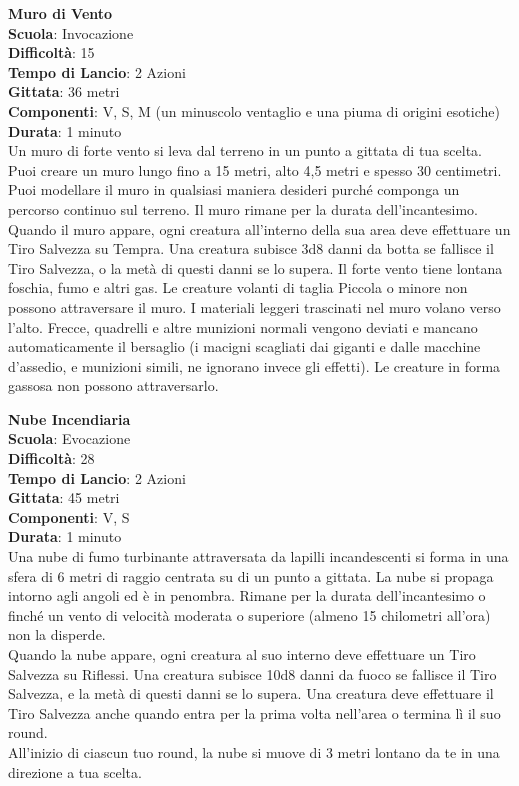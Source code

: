 \begin{multicols}{2}
\medskip\textbf{Muro di Vento}\\
\textbf{Scuola}: Invocazione\\
\textbf{Difficoltà}:  15\\
\textbf{Tempo di Lancio}: 2 Azioni\\
\textbf{Gittata}: 36 metri\\
\textbf{Componenti}: V, S, M (un minuscolo ventaglio e una piuma di origini esotiche)\\
\textbf{Durata}: 1 minuto\\
Un muro di forte vento si leva dal terreno in un punto a gittata di tua scelta. Puoi creare un muro lungo fino a 15 metri, alto 4,5 metri e spesso 30 centimetri. Puoi modellare il muro in qualsiasi maniera desideri purché componga un percorso continuo sul terreno. Il muro rimane per la durata dell'incantesimo. Quando il muro appare, ogni creatura all'interno della sua area deve effettuare un Tiro Salvezza su Tempra. Una creatura subisce 3d8 danni da botta se fallisce il Tiro Salvezza, o la metà di questi danni se lo supera. Il forte vento tiene lontana foschia, fumo e altri gas. Le creature volanti di taglia Piccola o minore non possono attraversare il muro. I materiali leggeri trascinati nel muro volano verso l’alto. Frecce, quadrelli e altre munizioni normali vengono deviati e mancano automaticamente il bersaglio (i macigni scagliati dai giganti e dalle macchine d’assedio, e munizioni simili, ne ignorano invece gli effetti). Le creature in forma gassosa non possono attraversarlo.

\medskip\textbf{Nube Incendiaria}\\
\textbf{Scuola}: Evocazione\\
\textbf{Difficoltà}:  28\\
\textbf{Tempo di Lancio}: 2 Azioni\\
\textbf{Gittata}: 45 metri\\
\textbf{Componenti}: V, S\\
\textbf{Durata}: 1 minuto\\
Una nube di fumo turbinante attraversata da lapilli incandescenti si forma in una sfera di 6 metri di raggio centrata su di un punto a gittata. La nube si propaga intorno agli angoli ed è in penombra. Rimane per la durata dell'incantesimo o finché un vento di velocità moderata o superiore (almeno 15 chilometri all'ora) non la disperde.\\
Quando la nube appare, ogni creatura al suo interno deve effettuare un Tiro Salvezza su Riflessi. Una creatura subisce 10d8 danni da fuoco se fallisce il Tiro Salvezza, e la metà di questi danni se lo supera. Una creatura deve effettuare il Tiro Salvezza anche quando entra per la prima volta nell'area o termina lì il suo round.\\
All'inizio di ciascun tuo round, la nube si muove di 3 metri lontano da te in una direzione a tua scelta. \\


\end{multicols}
